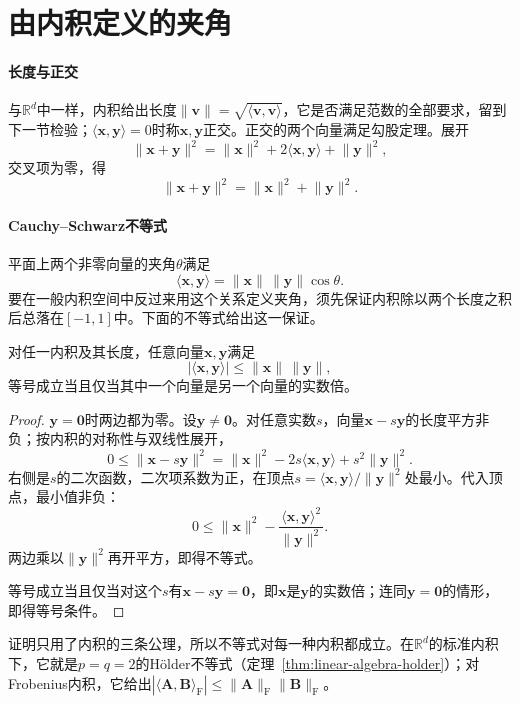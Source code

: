 
\section{由内积定义的夹角}
\label{sec:ls-inner-product-angle}

\paragraph{长度与正交}
与$\mathbb R^d$中一样，内积给出长度$\lVert\bm v\rVert=\sqrt{\langle\bm v,\bm v\rangle}$，它是否满足范数的全部要求，留到下一节检验；$\langle\bm x,\bm y\rangle=0$时称$\bm x,\bm y$正交。正交的两个向量满足勾股定理。展开
\[
 \lVert\bm x+\bm y\rVert^2=\lVert\bm x\rVert^2+2\langle\bm x,\bm y\rangle+\lVert\bm y\rVert^2,
\]
交叉项为零，得
\[
 \lVert\bm x+\bm y\rVert^2=\lVert\bm x\rVert^2+\lVert\bm y\rVert^2 .
\]

\paragraph{Cauchy--Schwarz不等式}
平面上两个非零向量的夹角$\theta$满足
\[
 \langle\bm x,\bm y\rangle=\lVert\bm x\rVert\,\lVert\bm y\rVert\cos\theta.
\]
要在一般内积空间中反过来用这个关系定义夹角，须先保证内积除以两个长度之积后总落在$[-1,1]$中。下面的不等式给出这一保证。
\begin{theorem}
\label{thm:linear-algebra-cauchy-schwarz}
对任一内积及其长度，任意向量$\bm x,\bm y$满足
\begin{equation}
 |\langle\bm x,\bm y\rangle|\leq\lVert\bm x\rVert\,\lVert\bm y\rVert,
 \label{eq:prelim-cauchy-schwarz}
\end{equation}
等号成立当且仅当其中一个向量是另一个向量的实数倍。
\end{theorem}
\begin{proof}
$\bm y=\bm0$时两边都为零。设$\bm y\neq\bm0$。对任意实数$s$，向量$\bm x-s\bm y$的长度平方非负；按内积的对称性与双线性展开，
\[
 0\leq\lVert\bm x-s\bm y\rVert^2
 =\lVert\bm x\rVert^2-2s\langle\bm x,\bm y\rangle+s^2\lVert\bm y\rVert^2.
\]
右侧是$s$的二次函数，二次项系数为正，在顶点$s=\langle\bm x,\bm y\rangle/\lVert\bm y\rVert^2$处最小。代入顶点，最小值非负：
\[
 0\leq\lVert\bm x\rVert^2-\frac{\langle\bm x,\bm y\rangle^2}{\lVert\bm y\rVert^2}.
\]
两边乘以$\lVert\bm y\rVert^2$再开平方，即得不等式。

等号成立当且仅当对这个$s$有$\bm x-s\bm y=\bm0$，即$\bm x$是$\bm y$的实数倍；连同$\bm y=\bm0$的情形，即得等号条件。
\end{proof}
证明只用了内积的三条公理，所以不等式对每一种内积都成立。在$\mathbb R^d$的标准内积下，它就是$p=q=2$的Hölder不等式（定理~\ref{thm:linear-algebra-holder}）；对Frobenius内积，它给出$|\langle\bm A,\bm B\rangle_{\mathrm F}|\leq\lVert\bm A\rVert_{\mathrm F}\lVert\bm B\rVert_{\mathrm F}$。

